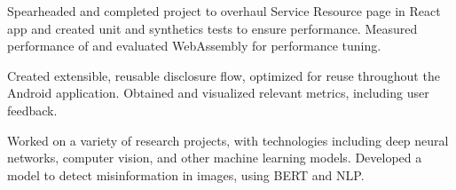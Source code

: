 \documentclass[10pt,a4paper,ragged2e,withhyper]{altacv}
\begin{document}
    \begin{paracol}{2}

        \newline

    \switchcolumn

              

    \switchcolumn*

    
    Spearheaded and completed project to overhaul Service Resource page in React app and created unit and synthetics tests to ensure performance. Measured performance of and evaluated WebAssembly for performance tuning.\smallskip \smallskip
    \newline
        
    \newline
    \divider
    
    Created extensible, reusable disclosure flow, optimized for reuse throughout the Android application. Obtained and visualized relevant metrics, including user feedback.\smallskip \smallskip
    \newline
       
    \newline
    \divider
    
   Worked on a variety of research projects, with technologies including deep neural networks, computer vision, and other machine learning models. Developed a model to detect misinformation in images, using BERT and NLP. \smallskip \smallskip
    \newline
        
    \newline


\end{paracol}
\end{document}
